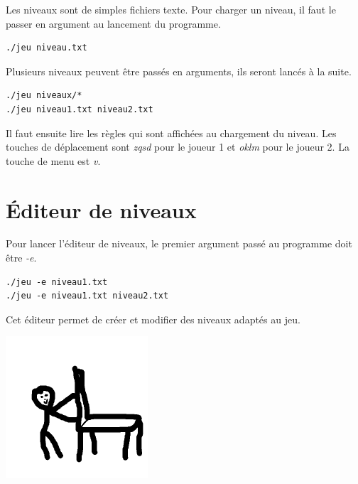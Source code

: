 \documentclass{article}
\begin{document}
Les niveaux sont de simples fichiers texte. 
Pour charger un niveau, il faut le passer en argument au lancement du programme.
\begin{lstlisting}
./jeu niveau.txt
\end{lstlisting}
Plusieurs niveaux peuvent être passés en arguments, ils seront lancés à la suite.
\begin{lstlisting}
./jeu niveaux/*
./jeu niveau1.txt niveau2.txt
\end{lstlisting}
Il faut ensuite lire les règles qui sont affichées au chargement du niveau.
Les touches de déplacement sont \emph{zqsd} pour le joueur 1 et \emph{oklm} pour le joueur 2.
La touche de menu est \emph{v}.

\section{Éditeur de niveaux}
Pour lancer l'éditeur de niveaux, le premier argument passé au programme doit être \emph{-e}.
\begin{lstlisting}
./jeu -e niveau1.txt
./jeu -e niveau1.txt niveau2.txt
\end{lstlisting}
Cet éditeur permet de créer et modifier des niveaux adaptés au jeu.

\begin{center}
    \includegraphics[width=200px,height=200px]{logo.png}
\end{center}
\end{document}
